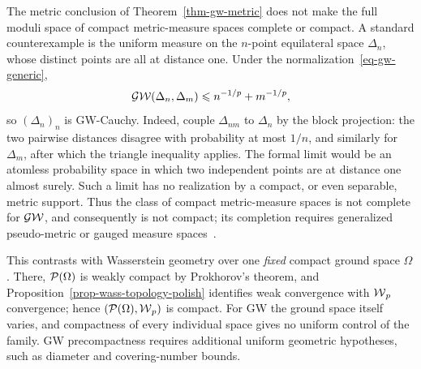 \begin{rem}\label{rem-gw-not-complete}
	The metric conclusion of Theorem~\ref{thm-gw-metric} does not make the full moduli space of compact metric-measure spaces complete or compact. A standard counterexample is the uniform measure on the $n$-point equilateral space $\Delta_n$, whose distinct points are all at distance one. Under the normalization~\eqref{eq-gw-generic},
	\[
		\operatorname{\mathcal{GW}}(\Delta_n,\Delta_m)
		\leqslant n^{-1/p}+m^{-1/p},
	\]
	so $(\Delta_n)_n$ is GW-Cauchy. Indeed, couple $\Delta_{nm}$ to $\Delta_n$ by the block projection: the two pairwise distances disagree with probability at most $1/n$, and similarly for $\Delta_m$, after which the triangle inequality applies. The formal limit would be an atomless probability space in which two independent points are at distance one almost surely. Such a limit has no realization by a compact, or even separable, metric support. Thus the class of compact metric-measure spaces is not complete for $\operatorname{\mathcal{GW}}$, and consequently is not compact; its completion requires generalized pseudo-metric or gauged measure spaces~\cite{memoli-2014,SturmGW}.

	This contrasts with Wasserstein geometry over one \emph{fixed} compact ground space $\Omega$. There, $\mathcal{P}(\Omega)$ is weakly compact by Prokhorov's theorem, and Proposition~\ref{prop-wass-topology-polish} identifies weak convergence with $\operatorname{\mathcal{W}}_p$ convergence; hence $(\mathcal{P}(\Omega),\operatorname{\mathcal{W}}_p)$ is compact. For GW the ground space itself varies, and compactness of every individual space gives no uniform control of the family. GW precompactness requires additional uniform geometric hypotheses, such as diameter and covering-number bounds.
\end{rem}

